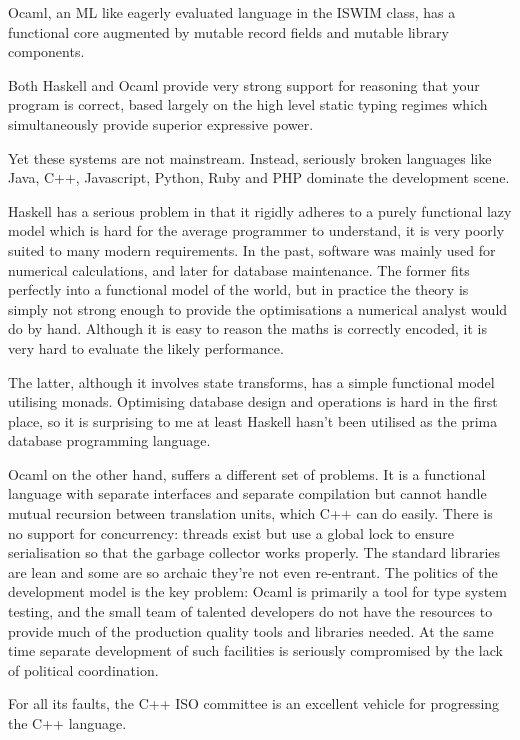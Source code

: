 \documentclass[oneside]{book}
\begin{document}
Ocaml, an ML like eagerly evaluated language in the
ISWIM class, has a functional core augmented by mutable
record fields and mutable library components.

Both Haskell and Ocaml provide very strong support for
reasoning that your program is correct, based largely
on the high level static typing regimes which simultaneously
provide superior expressive power.

Yet these systems are not mainstream. Instead, seriously
broken languages like Java, C++, Javascript, Python, Ruby and
PHP dominate the development scene.

Haskell has a serious problem in that it rigidly adheres to a
purely functional lazy model which is hard for the average
programmer to understand, it is very poorly suited to many
modern requirements. In the past, software was mainly used
for numerical calculations, and later for database maintenance.
The former fits perfectly into a functional model of the world,
but in practice the theory is simply not strong enough to provide
the optimisations a numerical analyst would do by hand.
Although it is easy to reason the maths is correctly encoded,
it is very hard to evaluate the likely performance.

The latter, although it involves state transforms, has a simple
functional model utilising monads. Optimising database design
and operations is hard in the first place, so it is surprising
to me at least Haskell hasn't been utilised as the prima
database programming language.

Ocaml on the other hand, suffers a different set of problems.
It is a functional language with separate interfaces and separate
compilation but cannot handle mutual recursion between 
translation units, which C++ can do easily. There is no support
for concurrency: threads exist but use a global lock to ensure
serialisation so that the garbage collector works properly.
The standard libraries are lean and some are so archaic they're
not even re-entrant. The politics of the development
model is the key problem: Ocaml is primarily a tool for
type system testing, and the small team of talented
developers do not have the resources to provide much of the
production quality tools and libraries needed. At the same
time separate development of such facilities 
is seriously compromised by the lack of political coordination.

For all its faults, the C++ ISO committee is an excellent vehicle
for progressing the C++ language.
\end{document}

